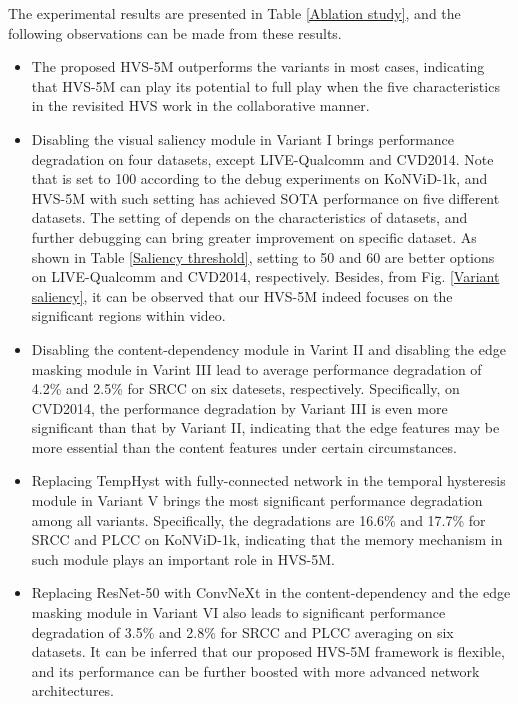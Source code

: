 \documentclass[journal]{IEEEtran}
\begin{document}
The experimental results are presented in Table \ref{Ablation study}, and the following observations can be made from these results.







\begin{itemize}
\item The proposed HVS-5M outperforms the variants in most cases, indicating that HVS-5M can play its potential to full play when the five characteristics in the revisited HVS work in the collaborative manner.





\item Disabling the visual saliency module in Variant I brings performance degradation on four datasets, except LIVE-Qualcomm and CVD2014.
    Note that  is set to 100 according to the debug experiments on KoNViD-1k, and HVS-5M with such setting has achieved SOTA performance on five different datasets.
    The setting of  depends on the characteristics of datasets, and further debugging  can bring greater improvement on specific dataset.
As shown in Table \ref{Saliency threshold}, setting  to 50 and 60 are better options on LIVE-Qualcomm and CVD2014, respectively.
Besides, from Fig. \ref{Variant saliency}, it can be observed that our HVS-5M indeed focuses on the significant regions within video.


\item Disabling the content-dependency module in Varint II and disabling the edge masking module in Varint III lead to average performance degradation of 4.2\% and 2.5\% for SRCC on six datesets, respectively. Specifically, on CVD2014, the performance degradation by Variant III is even more significant than that by Variant II, indicating that the edge features may be more essential than the content features under certain circumstances.



\item Replacing TempHyst with fully-connected network in the temporal hysteresis module in Variant V brings the most significant performance degradation among all variants.
    Specifically, the degradations are 16.6\% and 17.7\% for SRCC and PLCC on KoNViD-1k, indicating that the memory mechanism in such module plays an important role in HVS-5M.

\item Replacing ResNet-50 with ConvNeXt in the content-dependency and the edge masking module in Variant VI also leads to significant performance degradation of 3.5\% and 2.8\% for SRCC and PLCC averaging on six datasets.
    It can be inferred that our proposed HVS-5M framework is flexible, and its performance can be further boosted with more advanced network architectures.

\end{itemize}
\end{document}
